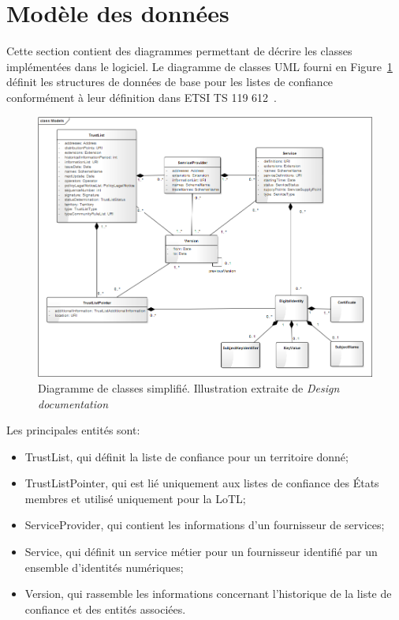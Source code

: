\documentclass{tnreport}
\begin{document}
\section{Modèle des données}

Cette section contient des diagrammes permettant de décrire les classes implémentées dans le logiciel. Le diagramme de classes UML fourni en Figure~\ref{fig:model} définit les structures de données de base pour les listes de confiance conformément à leur définition dans ETSI TS 119 612~\cite{ETSITS119612}.

\begin{figure}[h]
	\centering
	\includegraphics[scale=0.51]{figures/model}
	\caption{Diagramme de classes simplifié. Illustration extraite de \textit{Design documentation}~\cite{design-document}}
	\label{fig:model}
\end{figure}

Les principales entités sont:
\begin{itemize}
	\item TrustList, qui définit la liste de confiance pour un territoire donné;
	\item TrustListPointer, qui est lié uniquement aux listes de confiance des États membres et utilisé uniquement pour la LoTL;
	\item ServiceProvider, qui contient les informations d'un fournisseur de services;
	\item Service, qui définit un service métier pour un fournisseur identifié par un ensemble d'identités numériques;
	\item Version, qui rassemble les informations concernant l'historique de la liste de confiance et des entités associées.
\end{itemize}
\clearpage
\end{document}
